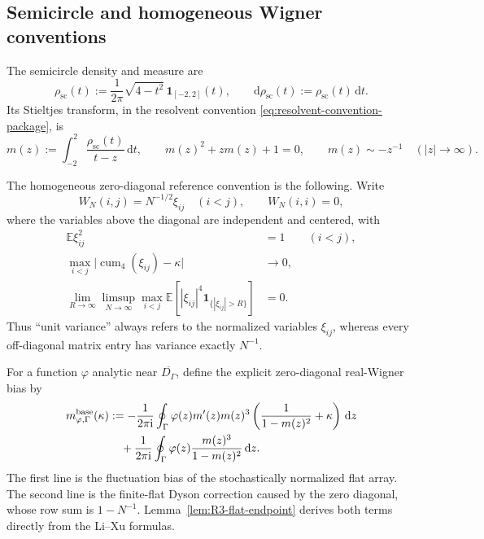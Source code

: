 \documentclass[11pt]{article}
\theoremstyle{definition}
\theoremstyle{remark}
\newcommand{\E}{\mathbb E}
\newcommand{\cum}{\operatorname{cum}}
\newcommand{\scal}{\mathrm{sc}}
\newcommand{\ii}{\mathrm i}
\newcommand{\dd}{\mathrm d}
\newcommand{\one}{\mathbf 1}
\newcommand{\abs}[1]{\lvert #1\rvert}
\begin{document}
\subsection{Semicircle and homogeneous Wigner conventions}

The semicircle density and measure are
\begin{equation}\label{eq:semicircle-density}
 \rho_{\scal}(t):=\frac{1}{2\pi}\sqrt{4-t^2}\,
 \one_{[-2,2]}(t),
 \qquad
 \dd\rho_{\scal}(t):=\rho_{\scal}(t)\,\dd t.
\end{equation}
Its Stieltjes transform, in the resolvent convention
\eqref{eq:resolvent-convention-package}, is
\begin{equation}\label{eq:semicircle-m-package}
 m(z):=\int_{-2}^2\frac{\rho_{\scal}(t)}{t-z}\,\dd t,
 \qquad
 m(z)^2+zm(z)+1=0,
 \qquad
 m(z)\sim-z^{-1}\quad(|z|\to\infty).
\end{equation}

The homogeneous zero-diagonal reference convention is the following.  Write
\begin{equation}\label{eq:base-Wigner-normalization}
 W_N(i,j)=N^{-1/2}\xi_{ij}\quad(i<j),
 \qquad W_N(i,i)=0,
\end{equation}
where the variables above the diagonal are independent and centered, with
\begin{align}
 \E\xi_{ij}^2&=1\qquad (i<j),
 \label{eq:base-Wigner-variance}\\
 \max_{i<j}\abs{\cum_4(\xi_{ij})-\kappa}&\longrightarrow0,
 \label{eq:base-Wigner-kappa}\\
 \lim_{R\to\infty}\limsup_{N\to\infty}\max_{i<j}
 \E\!\left[|\xi_{ij}|^4\one_{\{|\xi_{ij}|>R\}}\right]&=0.
 \label{eq:base-Wigner-Lindeberg}
\end{align}
Thus ``unit variance'' always refers to the normalized variables \(\xi_{ij}\),
whereas every off-diagonal matrix entry has variance exactly \(N^{-1}\).

For a function \(\varphi\) analytic near \(\overline{D_\Gamma}\), define the
explicit zero-diagonal real-Wigner bias by
\begin{align}
 m_{\varphi,\Gamma}^{\rm base}(\kappa)
 &:=-\frac{1}{2\pi\ii}\oint_\Gamma
 \varphi(z)m'(z)m(z)^3
 \left(\frac{1}{1-m(z)^2}+\kappa\right)\,\dd z
 \notag\\
 &\quad+\frac{1}{2\pi\ii}\oint_\Gamma
 \varphi(z)\frac{m(z)^3}{1-m(z)^2}\,\dd z.
 \label{eq:base-mean-definition}
\end{align}
The first line is the fluctuation bias of the stochastically normalized flat
array.  The second line is the finite-flat Dyson correction caused by the zero
diagonal, whose row sum is \(1-N^{-1}\).  Lemma~\ref{lem:R3-flat-endpoint}
derives both terms directly from the Li--Xu formulas.
\end{document}
